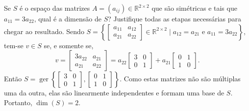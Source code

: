 \documentclass[12pt,a4paper]{article}
\newcommand*\ger[1]{\operatorname{ger}\left\{#1\right\}}
\newcommand*\R{\mathbb{R}}
\begin{document}
\begin{ExerciseList}
\Exercise[title={2,0}] Se $S$ é o espaço das matrizes $A = (a_{ij}) \in \R^{2\times 2}$ que são simétricas e tais que $a_{11} = 3a_{22}$, qual é a dimensão de $S$? Justifique todas as etapas necessárias para chegar ao resultado.
\Answer Sendo $S = \left\{
\begin{bmatrix}
a_{11} & a_{12} \\ a_{21} & a_{22}
\end{bmatrix} \in \R^{2 \times 2} \mid a_{12} = a_{21} \text{ e }
a_{11} = 3a_{22}
\right\}$,
tem-se $v \in S$ se, e somente se,
\[
v
=\begin{bmatrix}
3a_{22} & a_{21} \\ a_{21} & a_{22}
\end{bmatrix}
=
a_{22}
\begin{bmatrix}
3 & 0 \\ 0 & 1
\end{bmatrix}
+
a_{21}
\begin{bmatrix}
0 & 1 \\ 1 & 0
\end{bmatrix}.
\]
Então $S = \ger{
\begin{bmatrix}
3 & 0 \\ 0 & 1
\end{bmatrix},
\begin{bmatrix}
0 & 1 \\ 1 & 0
\end{bmatrix}
}$. Como estas matrizes não são múltiplas uma da outra, elas são linearmente independentes e formam uma base de $S$. Portanto, $\operatorname{dim} (S) = 2$.


\end{ExerciseList}
\end{document}
